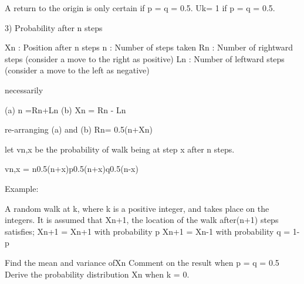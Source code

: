 A return to the origin is only certain if p = q = 0.5.
Uk= 1 if p = q = 0.5.

3) Probability after n steps

Xn : Position after n steps
n   : Number of steps taken
Rn : Number of rightward steps (consider a move to the right as positive)
Ln : Number of leftward steps (consider a move to the left as negative)

	necessarily
	
	 (a) n =Rn+Ln		 (b) Xn = Rn - Ln 

re-arranging (a) and (b)   Rn= 0.5(n+Xn) 

let vn,x be the probability of walk being at step x after n steps.

vn,x =  n0.5(n+x)p0.5(n+x)q0.5(n-x)


Example: 

A random walk at k, where k is a positive integer, and takes place on the integers. It is assumed that Xn+1, the location of the walk after(n+1) steps satisfies;
	Xn+1 = Xn+1 with probability p
	Xn+1 = Xn-1 with probability q = 1-p

Find the mean and variance ofXn
Comment on the result when p = q = 0.5
Derive the probability distribution Xn when k = 0.


